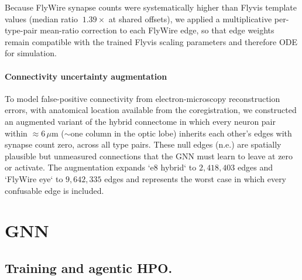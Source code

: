 \documentclass{article}
\begin{document}
Because FlyWire synapse counts were systematically higher than Flyvis template values (median ratio $~ 1.39\times$ at shared offsets), we applied a multiplicative per-type-pair mean-ratio correction to each FlyWire edge, so that edge weights remain compatible with the trained Flyvis scaling parameters and therefore ODE for simulation.



\paragraph{Connectivity uncertainty augmentation}

To model false-positive connectivity from electron-microscopy reconstruction errors, with anatomical location available from the coregistration, we constructed an augmented variant of the hybrid connectome in which every neuron pair within $\approx 6\,\mu\text{m}$ ($\sim$one column in the optic lobe) inherits
each other's edges with synapse count zero, across all type
pairs. These null edges (n.e.) are spatially plausible but
unmeasured connections that the GNN must learn to leave at zero or
activate. The augmentation expands `e8 hybrid` to $2{,}418{,}403$ edges and `FlyWire eye` to $9{,}642{,}335$ edges and represents the worst case in
which every confusable edge is included. 


\section{GNN}
\label{app:GNN}
\subsection{Training and agentic HPO.}
\end{document}
